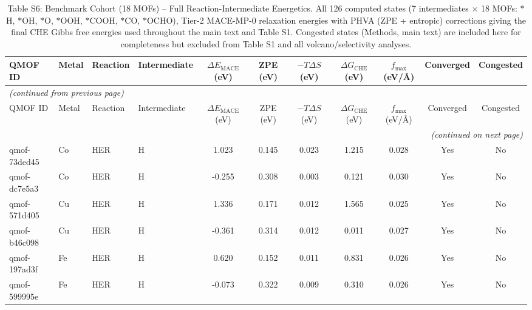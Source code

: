 {\scriptsize
\begin{longtable}{llllccccccc}
\caption{Table S6: Benchmark Cohort (18 MOFs) -- Full Reaction-Intermediate Energetics. All 126 computed states (7 intermediates $\times$ 18 MOFs: $*$H, $*$OH, $*$O, $*$OOH, $*$COOH, $*$CO, $*$OCHO), Tier-2 MACE-MP-0 relaxation energies with PHVA (ZPE + entropic) corrections giving the final CHE Gibbs free energies used throughout the main text and Table S1. Congested states (Methods, main text) are included here for completeness but excluded from Table S1 and all volcano/selectivity analyses.} \label{tab:benchmark_intermediates_full} \\
\hline\hline
QMOF ID & Metal & Reaction & Intermediate & $\Delta E_{\mathrm{MACE}}$ (eV) & ZPE (eV) & $-T\Delta S$ (eV) & $\Delta G_{\mathrm{CHE}}$ (eV) & $f_{\max}$ (eV/\AA) & Converged & Congested \\
\hline
\endfirsthead
\multicolumn{11}{l}{\textit{(continued from previous page)}} \\
\hline\hline
QMOF ID & Metal & Reaction & Intermediate & $\Delta E_{\mathrm{MACE}}$ (eV) & ZPE (eV) & $-T\Delta S$ (eV) & $\Delta G_{\mathrm{CHE}}$ (eV) & $f_{\max}$ (eV/\AA) & Converged & Congested \\
\hline
\endhead
\hline
\multicolumn{11}{r}{\textit{(continued on next page)}} \\
\endfoot
\hline\hline
\endlastfoot
qmof-73ded45 & Co & HER & H & 1.023 & 0.145 & 0.023 & 1.215 & 0.028 & Yes & No \\
qmof-dc7e5a3 & Co & HER & H & -0.255 & 0.308 & 0.003 & 0.121 & 0.030 & Yes & No \\
qmof-571d405 & Cu & HER & H & 1.336 & 0.171 & 0.012 & 1.565 & 0.025 & Yes & No \\
qmof-b46c098 & Cu & HER & H & -0.361 & 0.314 & 0.012 & 0.011 & 0.027 & Yes & No \\
qmof-197ad3f & Fe & HER & H & 0.620 & 0.152 & 0.011 & 0.831 & 0.026 & Yes & No \\
qmof-599995e & Fe & HER & H & -0.073 & 0.322 & 0.009 & 0.310 & 0.026 & Yes & No \\

\end{longtable}}
